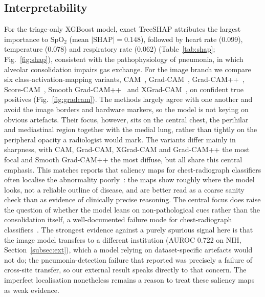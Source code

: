\documentclass[twocolumn, final]{svjour3}
\begin{document}
\subsection{Interpretability}
\label{subsec:interp}
For the triage-only XGBoost model, exact TreeSHAP attributes the largest importance
to SpO$_2$ (mean $|\text{SHAP}|=0.148$), followed by heart rate (0.099), temperature
(0.078) and respiratory rate (0.062) (Table~\ref{tab:shap};
Fig.~\ref{fig:shap}), consistent with the pathophysiology of pneumonia, in which
alveolar consolidation impairs gas exchange. For the image branch we compare six
class-activation-mapping variants, CAM~\citep{zhou2016cam},
Grad-CAM~\citep{selvaraju2017gradcam}, Grad-CAM++~\citep{chattopadhyay2018gradcampp},
Score-CAM~\citep{wang2020scorecam}, Smooth Grad-CAM++~\citep{omeiza2019smoothgradcampp}
and XGrad-CAM~\citep{fu2020xgradcam}, on confident true positives
(Fig.~\ref{fig:gradcam}). The methods largely agree with one another and avoid the image
borders and hardware markers, so the model is not keying on obvious artefacts. Their
focus, however, sits on the central chest, the perihilar and mediastinal region together
with the medial lung, rather than tightly on the peripheral opacity a radiologist would
mark. The variants differ mainly in sharpness, with CAM, Grad-CAM, XGrad-CAM and
Grad-CAM++ the most focal and Smooth Grad-CAM++ the most diffuse, but all share this
central emphasis. This matches reports that saliency maps for chest-radiograph
classifiers often localise the abnormality poorly~\citep{arun2021saliency}: the maps show
roughly where the model looks, not a reliable outline of disease, and are better read as
a coarse sanity check than as evidence of clinically precise reasoning. The central focus
does raise the question of whether the model leans on non-pathological cues rather than
the consolidation itself, a well-documented failure mode for chest-radiograph
classifiers~\citep{zech2018variable,degrave2021shortcuts}. The strongest evidence against
a purely spurious signal here is that the image model transfers to a different institution
(AUROC 0.722 on NIH, Section~\ref{subsec:ext}), which a model relying on dataset-specific
artefacts would not do; the pneumonia-detection failure that \citet{zech2018variable}
reported was precisely a failure of cross-site transfer, so our external result speaks
directly to that concern. The imperfect localisation nonetheless remains a reason to treat
these saliency maps as weak evidence.
\end{document}

